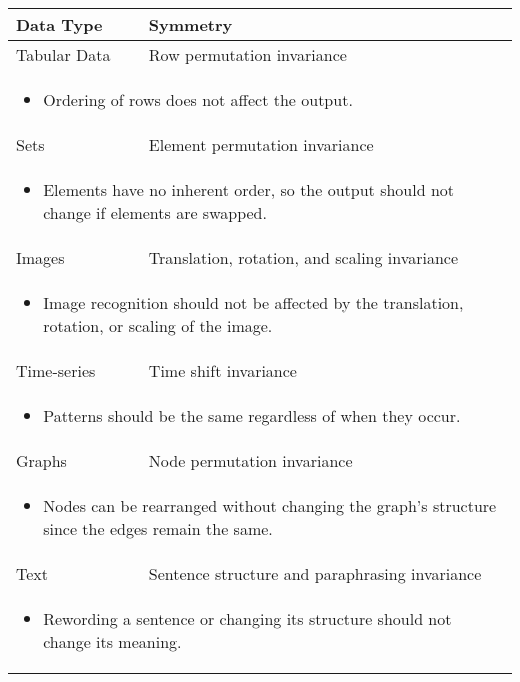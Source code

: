 \begin{summary}
    \begin{center}
        \begin{tabular}{ll}
            \toprule
            \textbf{Data Type} & \textbf{Symmetry} \\
            \toprule
            Tabular Data & Row permutation invariance \\
            \multicolumn{2}{p{\linewidth}}{
            \begin{itemize}
                \item Ordering of rows does not affect the output.
            \end{itemize}} \\
            \midrule
            Sets & Element permutation invariance \\ 
            \multicolumn{2}{p{\linewidth}}{
            \begin{itemize}
                \item Elements have no inherent order, so the output should not change if elements are swapped.
            \end{itemize}} \\
            \midrule
            Images & Translation, rotation, and scaling invariance \\
            \multicolumn{2}{p{\linewidth}}{
            \begin{itemize}
                \item Image recognition should not be affected by the translation, rotation, or scaling of the image.
            \end{itemize}} \\
            \midrule
            Time-series & Time shift invariance \\
            \multicolumn{2}{p{\linewidth}}{
            \begin{itemize}
                \item Patterns should be the same regardless of when they occur.
            \end{itemize}} \\
            \midrule
            Graphs & Node permutation invariance \\
            \multicolumn{2}{p{\linewidth}}{
            \begin{itemize}
                \item Nodes can be rearranged without changing the graph's structure since the edges remain the same.
            \end{itemize}} \\
            \midrule
            Text & Sentence structure and paraphrasing invariance \\
            \multicolumn{2}{p{\linewidth}}{
            \begin{itemize}
                \item Rewording a sentence or changing its structure should not change its meaning.
            \end{itemize}} \\
            \bottomrule
        \end{tabular}
    \end{center}
\end{summary}
\newpage

